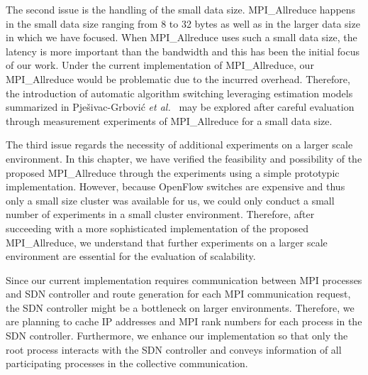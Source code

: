 The second issue is the handling of the small data size.
MPI\_Allreduce happens in the small data size ranging from 8 to
32 bytes as well as in the larger data size in which we have focused.
When MPI\_Allreduce uses such a small data size, the latency is
more important than the bandwidth and this has been the initial focus of
our work. Under the current implementation of MPI\_Allreduce,
our MPI\_Allreduce would be problematic due to the incurred
overhead. Therefore, the introduction of automatic algorithm switching
leveraging estimation models summarized in Pje\v{s}ivac-Grbovi\'{c} \emph{et
al.}~\autocite{PjesivacGrbovic2007} may be explored after careful evaluation
through measurement experiments of MPI\_Allreduce for a small data size.

The third issue regards the necessity of additional experiments on a
larger scale environment. In this chapter, we have verified the
feasibility and possibility of the proposed MPI\_Allreduce
through the experiments using a simple prototypic implementation.
However, because OpenFlow switches are expensive and thus only a small
size cluster was available for us, we could only conduct
a small number of experiments in a small cluster environment. Therefore,
after succeeding with a more sophisticated implementation of the
proposed MPI\_Allreduce, we understand that further experiments
on a larger scale environment are essential for the evaluation of
scalability.

Since our current implementation requires communication between MPI
processes and SDN controller and route generation for each MPI
communication request, the SDN controller might be a bottleneck on
larger environments. Therefore, we are planning to cache IP addresses
and MPI rank numbers for each process in the SDN controller.
Furthermore, we enhance our implementation so that only the root process
interacts with the SDN controller and conveys information of all
participating processes in the collective communication.
